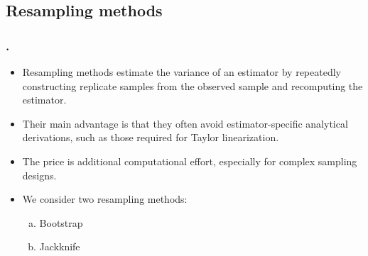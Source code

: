 \documentclass{my_eth_beamer}
\numberwithin{equation}{section}
\begin{document}
\subsection{Resampling methods}

\begin{frame}
    \frametitle{\insertsectionnumber.\insertsubsectionnumber~\insertsubsection}
    \begin{itemize}
    \setlength{\itemsep}{9pt}
        \item \alert{Resampling methods} estimate the variance of an estimator
            by repeatedly constructing \alert{replicate samples} from the
            observed sample and recomputing the estimator.
        \item Their main advantage is that they often avoid
            \alert{estimator-specific analytical derivations}, such as those
            required for Taylor linearization.
        \item The price is additional \alert{computational effort}, especially
            for complex sampling designs.
        \item We consider two resampling methods:
            \vspace{0.25em}
            \begin{enumerate}[a)]
            \setlength{\itemsep}{4pt}
                \item Bootstrap
                \item Jackknife
            \end{enumerate}
    \end{itemize}
\end{frame}
\end{document}
